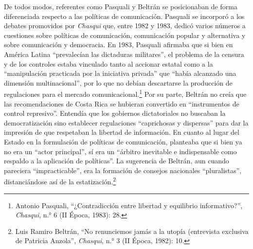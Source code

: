 \documentclass{tufte-handout}
\begin{document}
De todos modos, referentes como Pasquali y Beltrán se posicionaban de
forma diferenciada respecto a las políticas de comunicación. Pasquali se
incorporó a los debates promovidos por \emph{Chasqui} que, entre 1982 y
1983, dedicó varios números a cuestiones sobre políticas de
comunicación, comunicación popular y alternativa y sobre comunicación y
democracia. En 1983, Pasquali afirmaba que si bien en América Latina
``prevalecían las dictaduras militares'', el problema de la censura y de
los controles estaba vinculado tanto al accionar estatal como a la
``manipulación practicada por la iniciativa privada'' que ``había
alcanzado una dimensión multinacional'', por lo que no debían
descartarse la producción de regulaciones para el mercado
comunicacional.\footnote{Antonio Pasquali, ``¿Contradicción entre
  libertad y equilibrio informativo?'', \emph{Chasqui}, n.° 6 (II Época,
  1983): 28.} Por su parte, Beltrán no creía que las recomendaciones de
Costa Rica se hubieran convertido en ``instrumentos de control
represivo''. Entendía que los gobiernos dictatoriales no buscaban la
democratización sino establecer regulaciones ``caprichosas y dispersas''
para dar la impresión de que respetaban la libertad de información. En
cuanto al lugar del Estado en la formulación de políticas de
comunicación, planteaba que si bien ya no era un ``actor principal'', sí
era un ``árbitro inevitable e indispensable como respaldo a la
aplicación de políticas''. La sugerencia de Beltrán, aun cuando
pareciera ``impracticable'', era la formación de consejos nacionales
``pluralistas'', distanciándose así de la estatización.\footnote{Luis
  Ramiro Beltrán, ``No renunciemos jamás a la utopía (entrevista
  exclusiva de Patricia Anzola'', \emph{Chasqui}, n.° 3 (II Época,
  1982): 10.}
\end{document}
